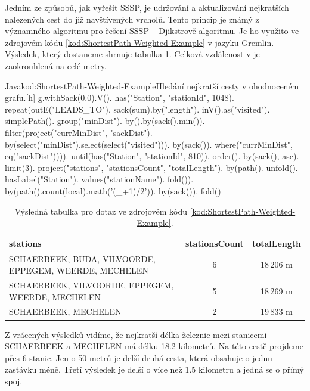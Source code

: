 \documentclass[
  program=infoi,
  biblatex=true,
  sourcecodes=true,
  figures=true,
  glossaries=false,
  index
]{kidiplom}
\begin{document}
Jedním ze způsobů, jak vyřešit SSSP, je udržování a aktualizování nejkratších nalezených cest do již navštívených vrcholů. Tento princip je známý z významného algoritmu pro řešení SSSP -- Djikstrově algoritmu. Je ho využito ve zdrojovém kódu \ref{kod:ShortestPath-Weighted-Example} v jazyku Gremlin. Výsledek, který dostaneme shrnuje tabulka \ref{tab:ShortestPath-Weighted-Example}. Celková vzdálenost v je zaokrouhlená na celé metry.

\begin{kicode}{Java}{kod:ShortestPath-Weighted-Example}{Hledání nejkratší cesty v ohodnoceném grafu.}[h]
g.withSack(0.0).V().
    has("Station", "stationId", 1048).
    repeat(outE("LEADS_TO").
            sack(sum).by("length").
            inV().as("visited").
            simplePath().
            group("minDist").
                by().by(sack().min()).
            filter(project("currMinDist", "sackDist").
                    by(select("minDist").select(select("visited"))).
                    by(sack()).
                where("currMinDist", eq("sackDist")))).
    until(has("Station", "stationId", 810)).
    order().
        by(sack(), asc).
    limit(3).
    project("stations", "stationsCount", "totalLength").
        by(path().
            unfold().
            hasLabel("Station").
            values("stationName").
            fold()).
        by(path().count(local).math('(_+1)/2')).
        by(sack()).
    fold() 
\end{kicode}

\begin{table}[h]
\caption{Výsledná tabulka pro dotaz ve zdrojovém kódu \ref{kod:ShortestPath-Weighted-Example}.}
\label{tab:ShortestPath-Weighted-Example}
\begin{tabularx}{\textwidth}{ | X | c | c | }
 \hline
 \textbf{stations}  & \textbf{stationsCount} & \textbf{totalLength} \\
 \hline \hline
 SCHAERBEEK, BUDA, VILVOORDE, EPPEGEM, WEERDE, MECHELEN & 6 & 18\,206 m \\
 \hline
 SCHAERBEEK, VILVOORDE, EPPEGEM, WEERDE, MECHELEN & 5 & 18\,269 m \\
 \hline
 SCHAERBEEK, MECHELEN & 2 & 19\,833 m \\
 \hline
\end{tabularx}
\end{table}

Z vrácených výsledků vidíme, že nejkratší délka železnic mezi stanicemi SCHAERBEEK a MECHELEN má délku 18.2 kilometrů. Na této cestě projdeme přes 6 stanic. Jen o 50 metrů je delší druhá cesta, která obsahuje o jednu zastávku méně. Třetí výsledek je delší o více než 1.5 kilometru a jedná se o přímý spoj.
\end{document}
